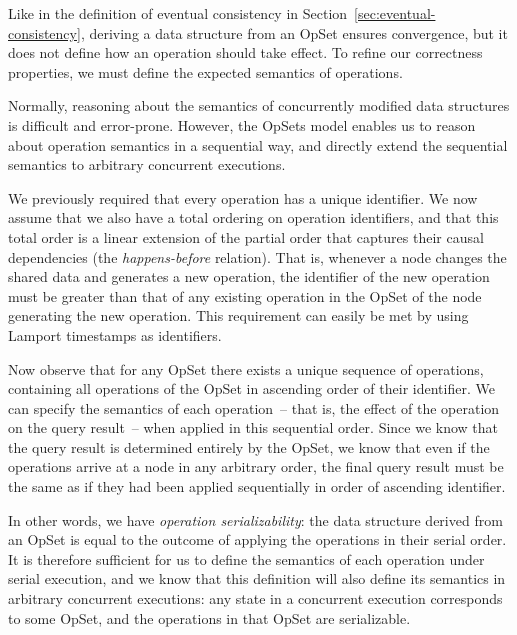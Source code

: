 Like in the definition of eventual consistency in Section~\ref{sec:eventual-consistency}, deriving a data structure from an OpSet ensures convergence, but it does not define how an operation should take effect.
To refine our correctness properties, we must define the expected semantics of operations.

Normally, reasoning about the semantics of concurrently modified data structures is difficult and error-prone.
However, the OpSets model enables us to reason about operation semantics in a sequential way, and directly extend the sequential semantics to arbitrary concurrent executions.

We previously required that every operation has a unique identifier.
We now assume that we also have a total ordering on operation identifiers, and that this total order is a linear extension of the partial order that captures their causal dependencies (the \emph{happens-before} relation).
That is, whenever a node changes the shared data and generates a new operation, the identifier of the new operation must be greater than that of any existing operation in the OpSet of the node generating the new operation.
This requirement can easily be met by using Lamport timestamps \cite{Lamport:1978jq} as identifiers.

Now observe that for any OpSet there exists a unique sequence of operations, containing all operations of the OpSet in ascending order of their identifier.
We can specify the semantics of each operation~-- that is, the effect of the operation on the query result~-- when applied in this sequential order.
Since we know that the query result is determined entirely by the OpSet, we know that even if the operations arrive at a node in any arbitrary order, the final query result must be the same as if they had been applied sequentially in order of ascending identifier.

In other words, we have \emph{operation serializability}: the data structure derived from an OpSet is equal to the outcome of applying the operations in their serial order.
It is therefore sufficient for us to define the semantics of each operation under serial execution, and we know that this definition will also define its semantics in arbitrary concurrent executions: any state in a concurrent execution corresponds to some OpSet, and the operations in that OpSet are serializable.
